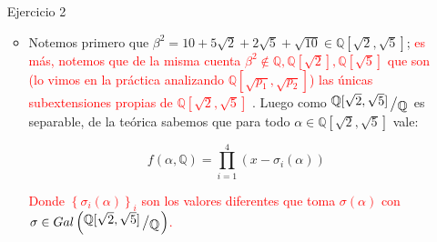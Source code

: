 \documentclass[11pt]{article}
\newcommand{\Q}{\mathbb{Q}}
\newcommand{\sett}[1]{\left\lbrace#1\right\rbrace}
\newcommand{\quotient}[2]{{\raisebox{.2em}{$#1$}\left/\raisebox{-.2em}{$#2$}\right.}}
\numberwithin{theorem}{subsection}
\newcommand{\qed}{\nobreak \ifvmode \relax \else
	\ifdim\lastskip<1.5em \hskip-\lastskip
	\hskip1.5em plus0em minus0.5em \fi \nobreak
	\vrule height0.75em width0.5em depth0.25em\fi}
\begin{document}
\begin{enumerate}
\begin{itemize}
	\begin{equation*}
		\begin{aligned}
			\dfrac{\left(t^{37^2} - t\right)^{38}}{\left(t^{37} - t\right)^{37^2 + 1}} = & \dfrac{t^{q+1}\left(t^{q^2 -1} - 1\right)^{q+1}}{t^{q^2 + 1}\left(t^{q-1} - 1\right)^{q^2 + 1}} \\
			= & \dfrac{\left( \left(t^{q -1} \right)^{q+1} - 1\right)^{q+1}}{t^{q^2 - q} \left(t^{q-1} - 1\right)^{q^2 + 1}} \\
			= & \dfrac{\left( \left(t^{q -1} \right) - 1\right)^{q+1} \left(\sum\limits_{r=0}^{q}{t^{(q-1)r}}\right)^{q+1}}{t^{q^2 - q} \left(t^{q-1} - 1\right)^{q^2 + 1}}  \\
			= & \dfrac{\left(\sum\limits_{r=0}^{q}{t^{(q-1)r}}\right)^{q+1}}{t^{q^2 - q} \left(t^{q-1} - 1\right)^{q^2 -q}}  \\
			= & \frac{g}{h} \qquad \text{pues } (g,h) = 1
		\end{aligned}
	\end{equation*}
	
	Y finalmente $\max \left\lbrace gr(g), gr(h) \right\rbrace = \max \sett{\underbrace{q^2 - q + \left(q-1\right)\left(q^2 - q\right)}_{q^3 - q^2}, \underbrace{(q-1)q(q+1)}_{q^3 - q}} = q^3 - q$, luego conlcuimos que $E^G = \mathbb{F}_{37}(f)$. \qed
	
	\end{itemize}
	
	\item[Ejercicio 2] 
	
	\begin{itemize}
		\item Notemos primero que $\beta^2 = 10 + 5\sqrt{2} + 2\sqrt{5} + \sqrt{10} \in \Q[\sqrt{2}, \sqrt{5 }]$; \textcolor{red}{
			 es m\'as, notemos que de la misma cuenta $\beta^2 \not\in  \Q,  \Q[\sqrt{2}],  \Q[\sqrt{5 }]$ que son (lo vimos en la pr\'actica analizando $\Q[\sqrt{p_1}, \sqrt{p_2}]$) las \'unicas subextensiones propias de $\Q[\sqrt{2}, \sqrt{5}]$ 
		 }. Luego como $\quotient{\Q[\sqrt{2}, \sqrt{5 }]}{\Q}$ es separable, de la te\'orica sabemos que para todo $\alpha \in \Q[\sqrt{2}, \sqrt{5 }]$ vale:
		
		\begin{equation*}
			f \left(\alpha, \Q\right) = \prod\limits_{i=1}^{4} \left(x - \sigma_i(\alpha)\right)
		\end{equation*}
		
		\textcolor{red}{Donde $\sett{\sigma_i(\alpha)}_i$ son los valores diferentes que toma $\sigma(\alpha)$ con  $\sigma \in Gal \left(\quotient{\Q[\sqrt{2}, \sqrt{5 }]}{\Q}\right)$.}
		

\end{itemize}
\end{enumerate}
\end{document}
